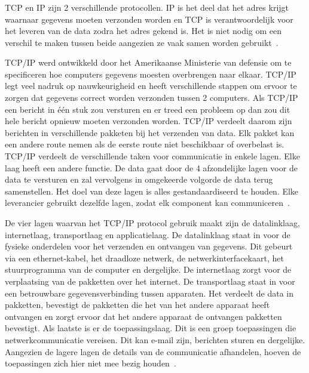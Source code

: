 \subsubsection{}
\label{subsec:TCP/IP}
TCP en IP zijn 2 verschillende protocollen. IP is het deel dat het adres krijgt waarnaar gegevens moeten verzonden worden en TCP is verantwoordelijk voor het leveren van de data zodra het adres gekend is. Het is niet nodig om een verschil te maken tussen beide aangezien ze vaak samen worden gebruikt~\autocite{Sharon2019}. 

TCP/IP werd ontwikkeld door het Amerikaanse Ministerie van defensie om te specificeren hoe computers gegevens moesten overbrengen naar elkaar. TCP/IP legt veel nadruk op nauwkeurigheid en heeft verschillende stappen om ervoor te zorgen dat gegevens correct worden verzonden tussen 2 computers. Als TCP/IP een bericht in één stuk zou versturen en er treed een probleem op dan zou dit hele bericht opnieuw moeten verzonden worden. TCP/IP verdeelt daarom zijn berichten in verschillende pakketen bij het verzenden van data. Elk pakket kan een andere route nemen als de eerste route niet beschikbaar of overbelast is. TCP/IP verdeelt de verschillende taken voor communicatie in enkele lagen. Elke laag heeft een andere functie. De data gaat door de 4 afzondelijke lagen voor de data te versturen en zal vervolgens in omgekeerde volgorde de data terug samenstellen. Het doel van deze lagen is alles gestandaardiseerd te houden. Elke leverancier gebruikt dezelfde lagen, zodat elk component kan communiceren~\autocite{Sharon2019}. 

De vier lagen waarvan het TCP/IP protocol gebruik maakt zijn de datalinklaag, internetlaag, transportlaag en applicatielaag. De datalinklaag staat in voor de fysieke onderdelen voor het verzenden en ontvangen van gegevens. Dit gebeurt via een ethernet-kabel, het draadloze netwerk, de netwerkinterfacekaart, het stuurprogramma van de computer en dergelijke. De internetlaag zorgt voor de verplaatsing van de pakketten over het internet. De transportlaag staat in voor een betrouwbare gegevensverbinding tussen apparaten. Het verdeelt de data in pakketten, bevestigt de pakketten die het van het andere apparaat heeft ontvangen en zorgt ervoor dat het andere apparaat de ontvangen pakketten bevestigt. Als laatste is er de toepassingslaag. Dit is een groep toepassingen die netwerkcommunicatie vereisen. Dit kan e-mail zijn, berichten sturen en dergelijke. Aangezien de lagere lagen de details van de communicatie afhandelen, hoeven de toepassingen zich hier niet mee bezig houden~\autocite{Sharon2019}. 


